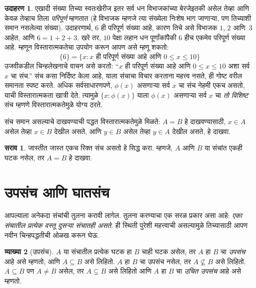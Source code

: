 \documentclass[11pt,a4paper,openany]{book}
\theoremstyle{definition}
\newtheorem{defn}{व्याख्या}[section]
\newtheorem{ex}[defn]{उदाहरण}
\newtheorem{prob}{सराव}[chapter]
\newenvironment{explain}{}{}
\newcommand{\Setabs}[2]{\{#1:#2\}}
\begin{document}
\begin{ex}
एखादी संख्या तिच्या स्वतःखेरीज इतर सर्व धन विभाजकांच्या बेरजेइतकी असेल तेव्हा
आणि केवळ तेव्हाच तिला \emph{परिपूर्ण} म्हणतात (हे विभाजक म्हणजे त्या संख्येला
निःशेष भाग जाणाऱ्या, पण तिच्याशी समान नसलेल्या संख्या).
उदाहरणार्थ, $6$ ही परिपूर्ण संख्या आहे, कारण तिचे असे विभाजक
$1$, $2$ आणि~$3$ आहेत, आणि $6 = 1 + 2 + 3$.
खरे तर, $10$ पेक्षा लहान धन पूर्णांकांपैकी $6$ हीच एकमेव परिपूर्ण संख्या आहे.
म्हणून विस्तारात्मकतेचा उपयोग करून आपण असे म्हणू शकतो:
\[
	\{6\} = \Setabs{x}{x\text{ ही परिपूर्ण संख्या आहे आणि }0 \leq x \leq 10}
\]
उजवीकडील चिन्हलेखनाचे वाचन असे करतो: ``$x$ ही परिपूर्ण संख्या आहे आणि
$0 \leq x \leq 10$ अशा सर्व $x$ चा संच.'' संच कसा निर्दिष्ट केला आहे,
याला संचाचा विचार करताना महत्त्व नसते, ही गोष्ट वरील समानता स्पष्ट करते.
अधिक सर्वसाधारणपणे, $\phi(x)$ असणाऱ्या सर्व $x$ चा संच नेहमी एकच असतो,
याची विस्तारात्मकता खात्री देते.
त्यामुळे $\Setabs{x}{\phi(x)}$ याला $\phi(x)$ असणाऱ्या सर्व $x$ चा
\emph{तो विशिष्ट} संच म्हणणे विस्तारात्मकतेमुळे योग्य ठरते.
\end{ex}


संच समान असल्याचे दाखवण्याची पद्धत विस्तारात्मकतेमुळे मिळते:
$A = B$ हे दाखवण्यासाठी, $x \in A$ असेल तेव्हा $x \in B$ देखील असते,
आणि $y \in B$ असेल तेव्हा $y \in A$ देखील असते, हे दाखवा.

\begin{prob}
जास्तीत जास्त एकच रिक्त संच असतो हे सिद्ध करा. म्हणजे, $A$ आणि $B$ या
संचांत एकही घटक नसेल, तर $A = B$ हे दाखवा.
\end{prob}











\section{उपसंच आणि घातसंच}\label{sfr:set:sub:sec}

\begin{explain}
आपल्याला अनेकदा संचांची तुलना करावी लागेल. तुलना करण्याचा एक सरळ प्रकार
असा आहे: \emph{एका संचातील प्रत्येक वस्तू दुसऱ्या संचातही असते}.
ही स्थिती पुरेशी महत्त्वाची असल्यामुळे तिच्यासाठी आपण नवीन चिन्हपद्धतीची
ओळख करून घेऊ.
\end{explain}

\begin{defn}[उपसंच]
$A$ या संचातील प्रत्येक घटक हा $B$ चाही घटक असेल,
तर $A$ हा $B$ चा \emph{उपसंच} आहे असे म्हणतो, आणि $A \subseteq B$ असे लिहितो.
$A$ हा $B$ चा उपसंच नसेल, तर $A \not\subseteq B$ असे लिहितो.
$A \subseteq B$ पण $A \neq B$ असेल, तर $A \subsetneq B$ असे लिहितो
आणि $A$ हा $B$ चा \emph{उचित उपसंच} आहे असे म्हणतो.
\end{defn}
\end{document}

